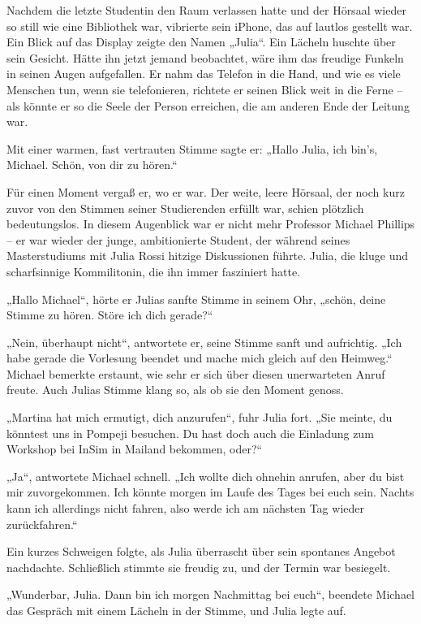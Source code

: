 \documentclass[
]{article}
\begin{document}
Nachdem die letzte Studentin den Raum verlassen hatte und der Hörsaal
wieder so still wie eine Bibliothek war, vibrierte sein iPhone, das auf
lautlos gestellt war. Ein Blick auf das Display zeigte den Namen
„Julia``. Ein Lächeln huschte über sein Gesicht. Hätte ihn jetzt jemand
beobachtet, wäre ihm das freudige Funkeln in seinen Augen aufgefallen.
Er nahm das Telefon in die Hand, und wie es viele Menschen tun, wenn sie
telefonieren, richtete er seinen Blick weit in die Ferne -- als könnte
er so die Seele der Person erreichen, die am anderen Ende der Leitung
war.

Mit einer warmen, fast vertrauten Stimme sagte er: „Hallo Julia, ich
bin's, Michael. Schön, von dir zu hören.``

Für einen Moment vergaß er, wo er war. Der weite, leere Hörsaal, der
noch kurz zuvor von den Stimmen seiner Studierenden erfüllt war, schien
plötzlich bedeutungslos. In diesem Augenblick war er nicht mehr
Professor Michael Phillips -- er war wieder der junge, ambitionierte
Student, der während seines Masterstudiums mit Julia Rossi hitzige
Diskussionen führte. Julia, die kluge und scharfsinnige Kommilitonin,
die ihn immer fasziniert hatte.

„Hallo Michael``, hörte er Julias sanfte Stimme in seinem Ohr, „schön,
deine Stimme zu hören. Störe ich dich gerade?{\kern0pt}``

„Nein, überhaupt nicht``, antwortete er, seine Stimme sanft und
aufrichtig. „Ich habe gerade die Vorlesung beendet und mache mich gleich
auf den Heimweg.`` Michael bemerkte erstaunt, wie sehr er sich über
diesen unerwarteten Anruf freute. Auch Julias Stimme klang so, als ob
sie den Moment genoss.

„Martina hat mich ermutigt, dich anzurufen``, fuhr Julia fort. „Sie
meinte, du könntest uns in Pompeji besuchen. Du hast doch auch die
Einladung zum Workshop bei InSim in Mailand bekommen, oder?{\kern0pt}``

„Ja``, antwortete Michael schnell. „Ich wollte dich ohnehin anrufen,
aber du bist mir zuvorgekommen. Ich könnte morgen im Laufe des Tages bei
euch sein. Nachts kann ich allerdings nicht fahren, also werde ich am
nächsten Tag wieder zurückfahren.``

Ein kurzes Schweigen folgte, als Julia überrascht über sein spontanes
Angebot nachdachte. Schließlich stimmte sie freudig zu, und der Termin
war besiegelt.

„Wunderbar, Julia. Dann bin ich morgen Nachmittag bei euch``, beendete
Michael das Gespräch mit einem Lächeln in der Stimme, und Julia legte
auf.
\end{document}
